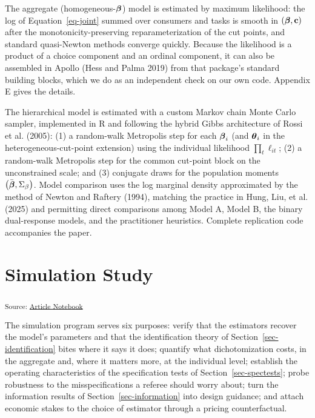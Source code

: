 \documentclass[
  letterpaper,
  DIV=11,
  numbers=noendperiod]{scrartcl}
\theoremstyle{plain}
\theoremstyle{plain}
\theoremstyle{remark}
\begin{document}
The aggregate (homogeneous-\(\boldsymbol{\beta}\)) model is estimated by maximum
likelihood: the log of Equation~\ref{eq-joint} summed over consumers and
tasks is smooth in \(\left( \boldsymbol{\beta}, \mathbf{c} \right)\) after the
monotonicity-preserving reparameterization of the cut points, and
standard quasi-Newton methods converge quickly. Because the likelihood
is a product of a choice component and an ordinal component, it can also
be assembled in Apollo (Hess and Palma 2019) from that package's
standard building blocks, which we do as an independent check on our own
code. Appendix E gives the details.

The hierarchical model is estimated with a custom Markov chain Monte
Carlo sampler, implemented in R and following the hybrid Gibbs
architecture of Rossi et al. (2005): (1) a random-walk Metropolis step
for each \(\boldsymbol{\beta}_i\) (and \(\boldsymbol{\theta}_i\) in the
heterogeneous-cut-point extension) using the individual likelihood
\(\prod_t \ell_{it}\); (2) a random-walk Metropolis step for the common
cut-point block on the unconstrained scale; and (3) conjugate draws for
the population moments \(\left( \bar{\boldsymbol{\beta}}, \Sigma_{\beta} \right)\).
Model comparison uses the log marginal density approximated by the
method of Newton and Raftery (1994), matching the practice in Hung, Liu,
et al. (2025) and permitting direct comparisons among Model A, Model B,
the binary dual-response models, and the practitioner heuristics.
Complete replication code accompanies the paper.

\section{Simulation Study}\label{sec-simstudy}

\textsubscript{Source:
\href{https://dyavorsky.github.io/ordinalDualresponse_paper/index.qmd.html}{Article
Notebook}}

The simulation program serves six purposes: verify that the estimators
recover the model's parameters and that the identification theory of
Section~\ref{sec-identification} bites where it says it does; quantify
what dichotomization costs, in the aggregate and, where it matters more,
at the individual level; establish the operating characteristics of the
specification tests of Section~\ref{sec-spectests}; probe robustness to
the misspecifications a referee should worry about; turn the information
results of Section~\ref{sec-information} into design guidance; and
attach economic stakes to the choice of estimator through a pricing
counterfactual.
\end{document}
